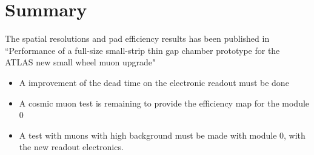 \section{Summary}
The spatial resolutions and pad efficiency results has been published in ``Performance of a full-size small-strip thin gap chamber prototype
for the ATLAS new small wheel muon upgrade"
	\begin{itemize}
	\item A improvement of the dead time on the electronic readout must be done
	\item A cosmic muon test is remaining to provide the efficiency map for the module 0
	\item A test with muons with high background must be made with module 0, with the new readout electronics.
	\end{itemize}
